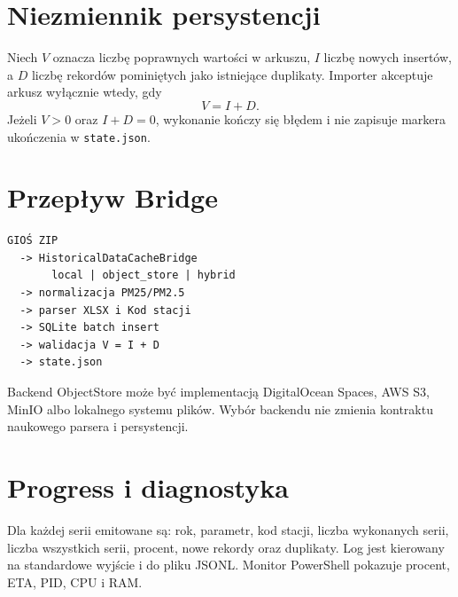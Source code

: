 \documentclass[11pt,a4paper]{article}
\begin{document}
\section{Niezmiennik persystencji}

Niech $V$ oznacza liczbę poprawnych wartości w arkuszu, $I$ liczbę nowych
insertów, a $D$ liczbę rekordów pominiętych jako istniejące duplikaty.
Importer akceptuje arkusz wyłącznie wtedy, gdy
\[
  V = I + D.
\]
Jeżeli $V>0$ oraz $I+D=0$, wykonanie kończy się błędem i nie zapisuje markera
ukończenia w \texttt{state.json}.

\section{Przepływ Bridge}

\begin{verbatim}
GIOŚ ZIP
  -> HistoricalDataCacheBridge
       local | object_store | hybrid
  -> normalizacja PM25/PM2.5
  -> parser XLSX i Kod stacji
  -> SQLite batch insert
  -> walidacja V = I + D
  -> state.json
\end{verbatim}

Backend ObjectStore może być implementacją DigitalOcean Spaces, AWS S3,
MinIO albo lokalnego systemu plików. Wybór backendu nie zmienia kontraktu
naukowego parsera i persystencji.

\section{Progress i diagnostyka}

Dla każdej serii emitowane są: rok, parametr, kod stacji, liczba wykonanych
serii, liczba wszystkich serii, procent, nowe rekordy oraz duplikaty. Log jest
kierowany na standardowe wyjście i do pliku JSONL. Monitor PowerShell pokazuje
procent, ETA, PID, CPU i RAM.
\end{document}
